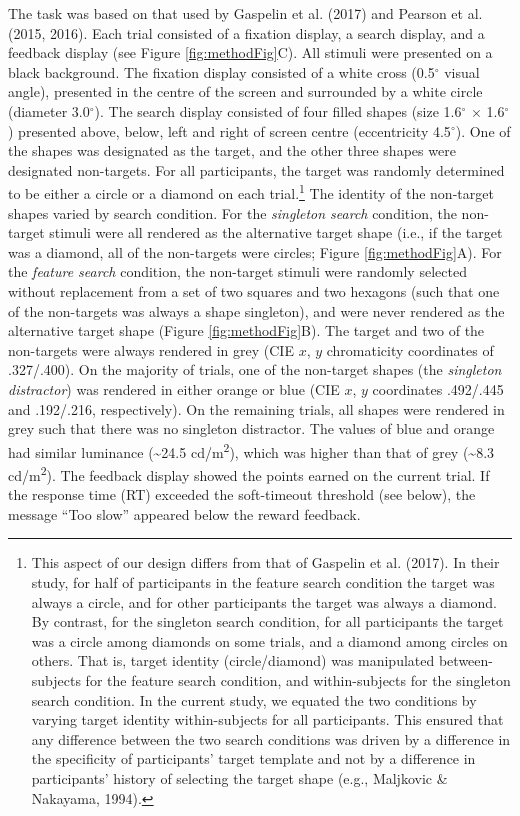 \documentclass[man, a4paper, noextraspace, 11pt,floatsintext]{apa6}
\let\rmarkdownfootnote\footnote%
\def\footnote{\protect\rmarkdownfootnote}
\theoremstyle{definition}
\theoremstyle{definition}
\theoremstyle{definition}
\theoremstyle{remark}
\begin{document}
The task was based on that used by Gaspelin et al. (2017) and Pearson et
al. (2015, 2016). Each trial consisted of a fixation display, a search
display, and a feedback display (see Figure \ref{fig:methodFig}C). All
stimuli were presented on a black background. The fixation display
consisted of a white cross (0.5\(^\circ\) visual angle), presented in
the centre of the screen and surrounded by a white circle (diameter
3.0\(^\circ\)). The search display consisted of four filled shapes (size
1.6\(^\circ\) \(\times\) 1.6\(^\circ\)) presented above, below, left and
right of screen centre (eccentricity 4.5\(^\circ\)). One of the shapes
was designated as the target, and the other three shapes were designated
non-targets. For all participants, the target was randomly determined to
be either a circle or a diamond on each trial.\footnote{This aspect of
  our design differs from that of Gaspelin et al. (2017). In their
  study, for half of participants in the feature search condition the
  target was always a circle, and for other participants the target was
  always a diamond. By contrast, for the singleton search condition, for
  all participants the target was a circle among diamonds on some
  trials, and a diamond among circles on others. That is, target
  identity (circle/diamond) was manipulated between-subjects for the
  feature search condition, and within-subjects for the singleton search
  condition. In the current study, we equated the two conditions by
  varying target identity within-subjects for all participants. This
  ensured that any difference between the two search conditions was
  driven by a difference in the specificity of participants' target
  template and not by a difference in participants' history of selecting
  the target shape (e.g., Maljkovic \& Nakayama, 1994).} The identity of
the non-target shapes varied by search condition. For the
\emph{singleton search} condition, the non-target stimuli were all
rendered as the alternative target shape (i.e., if the target was a
diamond, all of the non-targets were circles; Figure
\ref{fig:methodFig}A). For the \emph{feature search} condition, the
non-target stimuli were randomly selected without replacement from a set
of two squares and two hexagons (such that one of the non-targets was
always a shape singleton), and were never rendered as the alternative
target shape (Figure \ref{fig:methodFig}B). The target and two of the
non-targets were always rendered in grey (CIE \(x\), \(y\) chromaticity
coordinates of .327/.400). On the majority of trials, one of the
non-target shapes (the \emph{singleton distractor}) was rendered in
either orange or blue (CIE \(x\), \(y\) coordinates .492/.445 and
.192/.216, respectively). On the remaining trials, all shapes were
rendered in grey such that there was no singleton distractor. The values
of blue and orange had similar luminance (\textasciitilde{}24.5
cd/m\textsuperscript{2}), which was higher than that of grey
(\textasciitilde{}8.3 cd/m\textsuperscript{2}). The feedback display
showed the points earned on the current trial. If the response time (RT)
exceeded the soft-timeout threshold (see below), the message
\enquote{Too slow} appeared below the reward feedback.
\end{document}
